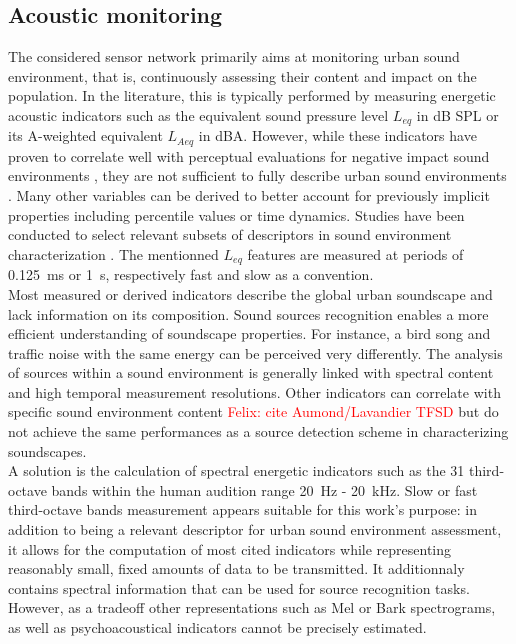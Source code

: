 \documentclass[12pt,times,onecolumn]{article}
\newcommand{\fg}[1]{\textcolor{red}{ Felix: #1}}
\begin{document}
\subsection{Acoustic monitoring}
The considered sensor network primarily aims at monitoring urban sound environment, that is, continuously assessing their content and impact on the population. In the literature, this is typically performed by measuring energetic acoustic indicators such as the equivalent sound pressure level $L_{eq}$ in dB SPL or its A-weighted equivalent $L_{Aeq}$ in dBA. However, while these indicators have proven to correlate well with perceptual evaluations for negative impact sound environments \cite{gozalo2015}, they are not sufficient to fully describe urban sound environments \cite{rychtarikova2013}. Many other variables can be derived to better account for previously implicit properties \cite{can2016} including percentile values or time dynamics. Studies have been conducted to select relevant subsets of descriptors in sound environment characterization \cite{can2015, brocolini2013, nilsson2007}. The mentionned $L_{eq}$ features are measured at periods of 0.125~ms or 1~s, respectively fast and slow as a convention.\\

Most measured or derived indicators describe the global urban soundscape and lack information on its composition. Sound sources recognition enables a more efficient understanding of soundscape properties. For instance, a bird song and traffic noise with the same energy can be perceived very differently. The analysis of sources within a sound environment is generally linked with spectral content \cite{ishiyama2000} and high temporal measurement resolutions. Other indicators can correlate with specific sound environment content \fg{cite Aumond/Lavandier TFSD} but do not achieve the same performances as a source detection scheme in characterizing soundscapes.\\

A solution is the calculation of spectral energetic indicators such as the 31 third-octave bands within the human audition range 20~Hz - 20~kHz. Slow or fast third-octave bands measurement appears suitable for this work's purpose: in addition to being a relevant descriptor \cite{torija2013} for urban sound environment assessment, it allows for the computation of most cited indicators while representing reasonably small, fixed amounts of data to be transmitted. It additionnaly contains spectral information that can be used for source recognition tasks. However, as a tradeoff other representations such as Mel or Bark spectrograms, as well as psychoacoustical indicators cannot be precisely estimated.
\end{document}
